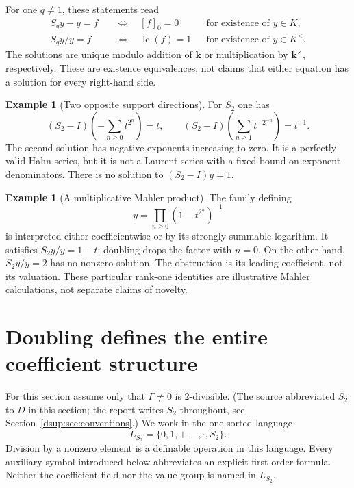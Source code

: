 \documentclass[11pt,oneside]{article}
\numberwithin{equation}{section}
\theoremstyle{definition}
\newtheorem{example}[theorem]{Example}
\theoremstyle{remark}
\newcommand{\kk}{\mathbf k}
\newcommand{\lc}{\operatorname{lc}}
\begin{document}
For one $q\ne1$, these statements read
\begin{align}
 S_qy-y=f&\quad\Longleftrightarrow\quad [f]_0=0
       &&\text{for existence of }y\in K,\label{dsup:eq:scalaradd}\\
 S_qy/y=f&\quad\Longleftrightarrow\quad \lc(f)=1
       &&\text{for existence of }y\in K^\times.\label{dsup:eq:scalarmult}
\end{align}
The solutions are unique modulo addition of $\kk$ or multiplication by
$\kk^\times$, respectively. These are existence equivalences, not claims
that either equation has a solution for every right-hand side.

\begin{example}[Two opposite support directions]\label{dsup:ex:opposite}
For $S_2$ one has
\[
 (S_2-I)\left(-\sum_{n\ge0}t^{2^n}\right)=t,
 \qquad
 (S_2-I)\left(\sum_{n\ge1}t^{-2^{-n}}\right)=t^{-1}.
\]
The second solution has negative exponents increasing to zero. It is a
perfectly valid Hahn series, but it is not a Laurent series with a fixed
bound on exponent denominators. There is no solution to
$(S_2-I)y=1$.
\end{example}

\begin{example}[A multiplicative Mahler product]\label{dsup:ex:product}
The family defining
\[
 y=\prod_{n\ge0}(1-t^{2^n})^{-1}
\]
is interpreted either coefficientwise or by its strongly summable
logarithm. It satisfies $S_2y/y=1-t$: doubling drops the factor with
$n=0$. On the other hand, $S_2y/y=2$ has no nonzero solution. The
obstruction is its leading coefficient, not its valuation. These
particular rank-one identities are illustrative Mahler calculations,
not separate claims of novelty.
\end{example}

\section{Doubling defines the entire coefficient structure}\label{dsup:sec:definability}

For this section assume only that $\Gamma\ne0$ is $2$-divisible. (The
source abbreviated $S_2$ to $D$ in this section; the report writes $S_2$
throughout, see Section~\ref{dsup:sec:conventions}.) We work in the
one-sorted language
\[
 L_{S_2}=\{0,1,+,-,\cdot,S_2\}.
\]
Division by a nonzero element is a definable operation in this language.
Every auxiliary symbol introduced below abbreviates an explicit
first-order formula. Neither the coefficient field nor the value group
is named in $L_{S_2}$.
\end{document}
